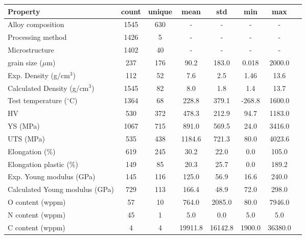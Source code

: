 \begin{tabular}{lccccccc}
\toprule
Property & count & unique & mean & std & min & max \\
\midrule
Alloy composition & 1545 & 630 & - & - & - & - \\
Processing method & 1426 & 5 & - & - & - & - \\
Microstructure & 1402 & 40 & - & - & - & - \\
grain size ($\mu$m) & 237 & 176 & 90.2 & 183.0 & 0.018 & 2000.0 \\
Exp. Density (g/cm$^3$) & 112 & 52 & 7.6 & 2.5 & 1.46 & 13.6 \\
Calculated Density (g/cm$^3$) & 1545 & 82 & 8.0 & 1.8 & 1.4 & 13.7 \\
Test temperature ($^\circ$C) & 1364 & 68 & 228.8 & 379.1 & -268.8 & 1600.0 \\
HV & 530 & 372 & 478.3 & 212.9 & 94.7 & 1183.0 \\
YS (MPa) & 1067 & 715 & 891.0 & 569.5 & 24.0 & 3416.0 \\
UTS (MPa) & 535 & 438 & 1184.6 & 721.3 & 80.0 & 4023.6 \\
Elongation (\%) & 619 & 245 & 30.2 & 22.0 & 0.0 & 105.0 \\
Elongation plastic (\%) & 149 & 85 & 20.3 & 25.7 & 0.0 & 189.2 \\
Exp. Young modulus (GPa) & 145 & 116 & 125.0 & 56.9 & 16.6 & 240.0 \\
Calculated Young modulus (GPa) & 729 & 113 & 166.4 & 48.9 & 72.0 & 298.0 \\
O content (wppm) & 57 & 10 & 764.0 & 2085.0 & 80.0 & 7946.0 \\
N content (wppm) & 45 & 1 & 5.0 & 0.0 & 5.0 & 5.0 \\
C content (wppm) & 4 & 4 & 19911.8 & 16142.8 & 1900.0 & 36380.0 \\
\bottomrule
\end{tabular}
